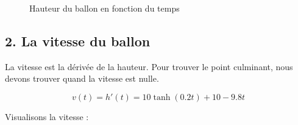 \documentclass[
  12pt,
  letterpaper,
]{book}
\theoremstyle{remark}
\begin{document}
\begin{figure}[H]


\caption{\label{fig-hauteur}Hauteur du ballon en fonction du temps}

\end{figure}%

\subsection{2. La vitesse du ballon}\label{la-vitesse-du-ballon}

La vitesse est la dérivée de la hauteur. Pour trouver le point
culminant, nous devons trouver quand la vitesse est nulle.

\[v(t) = h'(t) = 10\tanh(0.2t) + 10 - 9.8t\]

Visualisons la vitesse :
\end{document}
